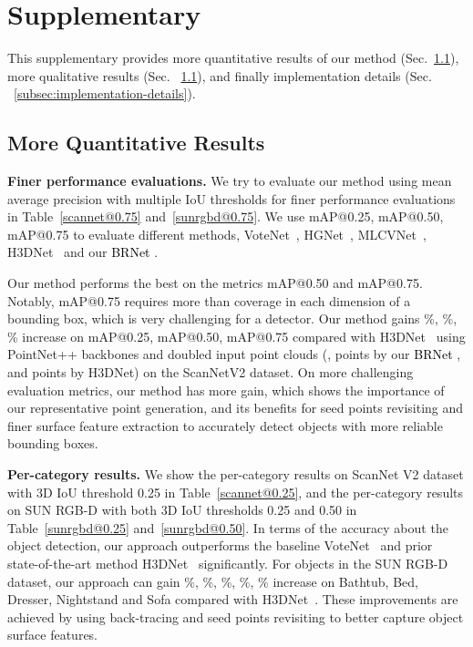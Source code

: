\documentclass[final]{cvpr}
\newcommand{\method}{\textcolor{black}{BRNet }}
\begin{document}
\section{Supplementary}
This supplementary provides more quantitative results of our method (Sec.~\ref{subsec:quantitative-results}), more qualitative results (Sec. ~\ref{subsec:quantitative-results}), and finally implementation details (Sec. ~\ref{subsec:implementation-details}).

\subsection{More Quantitative Results}
\label{subsec:quantitative-results}

\noindent\textbf{Finer performance evaluations.}
We try to evaluate our method using mean average precision with multiple IoU thresholds for finer performance evaluations in Table~\ref{scannet@0.75} and~\ref{sunrgbd@0.75}.
We use mAP@0.25, mAP@0.50, mAP@0.75 to evaluate different methods, \ie VoteNet~\cite{votenet}, HGNet~\cite{hgnet}, MLCVNet~\cite{mlcvnet}, H3DNet~\cite{h3dnet} and our \method.


Our method performs the best on the metrics mAP@0.50 and mAP@0.75. Notably, mAP@0.75 requires more than  coverage in each dimension of a bounding box, which is very challenging for a detector.
Our method gains \%, \%, \% increase on mAP@0.25, mAP@0.50, mAP@0.75 compared with H3DNet~\cite{h3dnet} using  PointNet++ backbones and doubled input point clouds (\ie,  points by our \method, and  points by H3DNet)  on the ScanNetV2 dataset.
On more challenging evaluation metrics, our method has more gain, which shows the importance of our representative point generation, and its benefits for seed points revisiting and finer surface feature extraction to accurately detect objects with more reliable bounding boxes.

\noindent\textbf{Per-category results.}
We show the per-category results on ScanNet V2 dataset with 3D IoU threshold 0.25 in Table~\ref{scannet@0.25}, and the per-category results on SUN RGB-D with both 3D IoU thresholds 0.25 and 0.50 in Table~\ref{sunrgbd@0.25} and~\ref{sunrgbd@0.50}.
In terms of the accuracy about the object detection, our approach outperforms the baseline VoteNet~\cite{votenet} and prior state-of-the-art method H3DNet~\cite{h3dnet} significantly. 
For objects in the SUN RGB-D dataset, our approach can gain \%, \%, \%, \%, \% increase on Bathtub, Bed, Dresser, Nightstand and Sofa compared with H3DNet~\cite{h3dnet}.
These improvements are achieved by using back-tracing and seed points revisiting to better capture object surface features.
\end{document}
